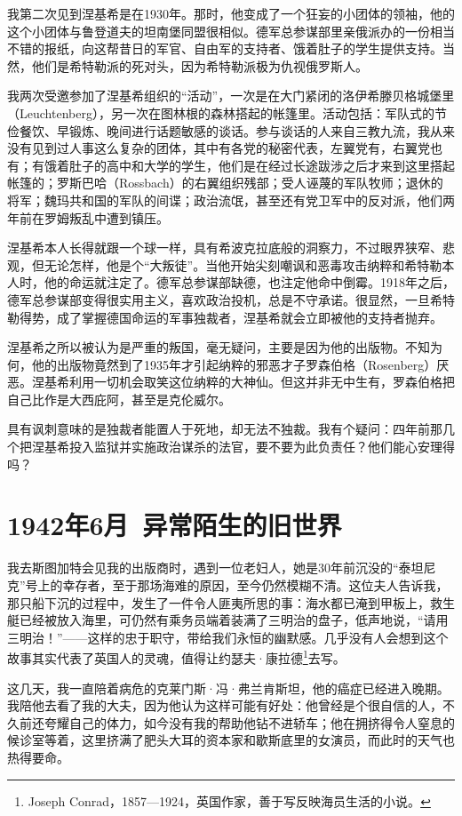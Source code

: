 \documentclass[UTF8]{ctexart}
\begin{document}
我第二次见到涅基希是在1930年。那时，他变成了一个狂妄的小团体的领袖，他的这个小团体与鲁登道夫的坦南堡同盟很相似。德军总参谋部里亲俄派办的一份相当不错的报纸，向这帮昔日的军官、自由军的支持者、饿着肚子的学生提供支持。当然，他们是希特勒派的死对头，因为希特勒派极为仇视俄罗斯人。

我两次受邀参加了涅基希组织的“活动”，一次是在大门紧闭的洛伊希滕贝格城堡里（Leuchtenberg），另一次在图林根的森林搭起的帐篷里。活动包括：军队式的节俭餐饮、早锻炼、晚间进行话题敏感的谈话。参与谈话的人来自三教九流，我从来没有见到过人事这么复杂的团体，其中有各党的秘密代表，左翼党有，右翼党也有；有饿着肚子的高中和大学的学生，他们是在经过长途跋涉之后才来到这里搭起帐篷的；罗斯巴哈（Rossbach）的右翼组织残部；受人诬蔑的军队牧师；退休的将军；魏玛共和国的军队的间谍；政治流氓，甚至还有党卫军中的反对派，他们两年前在罗姆叛乱中遭到镇压。

涅基希本人长得就跟一个球一样，具有希波克拉底般的洞察力，不过眼界狭窄、悲观，但无论怎样，他是个“大叛徒”。当他开始尖刻嘲讽和恶毒攻击纳粹和希特勒本人时，他的命运就注定了。德军总参谋部缺德，也注定他命中倒霉。1918年之后，德军总参谋部变得很实用主义，喜欢政治投机，总是不守承诺。很显然，一旦希特勒得势，成了掌握德国命运的军事独裁者，涅基希就会立即被他的支持者抛弃。

涅基希之所以被认为是严重的叛国，毫无疑问，主要是因为他的出版物。不知为何，他的出版物竟然到了1935年才引起纳粹的邪恶才子罗森伯格（Rosenberg）厌恶。涅基希利用一切机会取笑这位纳粹的大神仙。但这并非无中生有，罗森伯格把自己比作是大西庇阿，甚至是克伦威尔。

具有讽刺意味的是独裁者能置人于死地，却无法不独裁。我有个疑问：四年前那几个把涅基希投入监狱并实施政治谋杀的法官，要不要为此负责任？他们能心安理得吗？

\section{1942年6月\ 异常陌生的旧世界}

我去斯图加特会见我的出版商时，遇到一位老妇人，她是30年前沉没的“泰坦尼克”号上的幸存者，至于那场海难的原因，至今仍然模糊不清。这位夫人告诉我，那只船下沉的过程中，发生了一件令人匪夷所思的事：海水都已淹到甲板上，救生艇已经被放入海里，可仍然有乘务员端着装满了三明治的盘子，低声地说，“请用三明治！”——这样的忠于职守，带给我们永恒的幽默感。几乎没有人会想到这个故事其实代表了英国人的灵魂，值得让约瑟夫·康拉德\footnote{Joseph Conrad，1857—1924，英国作家，善于写反映海员生活的小说。}去写。

这几天，我一直陪着病危的克莱门斯·冯·弗兰肯斯坦，他的癌症已经进入晚期。我陪他去看了我的大夫，因为他认为这样可能有好处：他曾经是个很自信的人，不久前还夸耀自己的体力，如今没有我的帮助他钻不进轿车；他在拥挤得令人窒息的候诊室等着，这里挤满了肥头大耳的资本家和歇斯底里的女演员，而此时的天气也热得要命。
\end{document}
